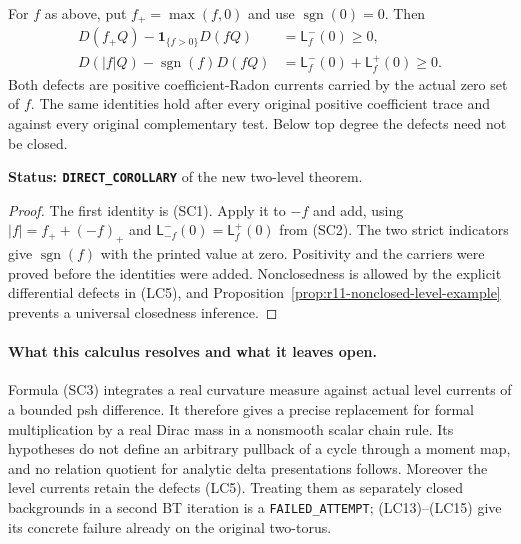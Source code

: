 \begin{corollary}
\label{cor:r11-original-kato}
For $f$ as above, put $f_+=\max(f,0)$ and use
$\operatorname{sgn}(0)=0$.  Then
\[
 \begin{split}
 D(f_+Q)-\mathbf1_{\{f>0\}}D(fQ)&=\mathsf L_f^-(0)\geq0,\\
 D(|f|Q)-\operatorname{sgn}(f)D(fQ)
                 &=\mathsf L_f^-(0)+\mathsf L_f^+(0)\geq0.
 \end{split}
 \tag{SC7}
\]
Both defects are positive coefficient-Radon currents carried by
the actual zero set of $f$.  The same identities hold after
every original positive coefficient trace and against every
original complementary test.  Below top degree the defects
need not be closed.
\end{corollary}

\noindent\textbf{Status: \texttt{DIRECT\_COROLLARY}} of the new
two-level theorem.

\begin{proof}
The first identity is (SC1).  Apply it to $-f$ and add, using
$|f|=f_++(-f)_+$ and
$\mathsf L_{-f}^-(0)=\mathsf L_f^+(0)$ from (SC2).
The two strict indicators give $\operatorname{sgn}(f)$ with
the printed value at zero.  Positivity and the carriers were
proved before the identities were added.  Nonclosedness is
allowed by the explicit differential defects in (LC5), and
Proposition~\ref{prop:r11-nonclosed-level-example} prevents a
universal closedness inference.
\end{proof}

\paragraph{What this calculus resolves and what it leaves open.}
Formula (SC3) integrates a real curvature measure against actual
level currents of a bounded psh difference.  It therefore gives
a precise replacement for formal multiplication by a real Dirac
mass in a nonsmooth scalar chain rule.  Its hypotheses do not
define an arbitrary pullback of a cycle through a moment map,
and no relation quotient for analytic delta presentations follows.
Moreover the level currents retain the defects (LC5).  Treating
them as separately closed backgrounds in a second BT iteration
is a \texttt{FAILED\_ATTEMPT}; (LC13)--(LC15) give its concrete
failure already on the original two-torus.

